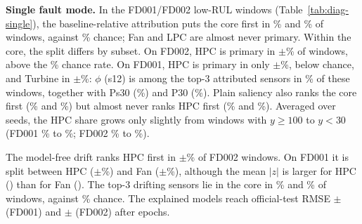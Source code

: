 \textbf{Single fault mode.} In the FD001/FD002 low-RUL windows (Table~\ref{tab:diag-single}), the baseline-relative attribution puts the core first in \DiagFdOneAttrCore{}\% and \DiagFdTwoAttrCore{}\% of windows, against \DiagChanceCore{}\% chance; Fan and LPC are almost never primary. Within the core, the split differs by subset. On FD002, HPC is primary in \DiagFdTwoAttrHpc{}$\pm$\DiagFdTwoAttrHpcStd{}\% of windows, above the \DiagChanceHpc{}\% chance rate. On FD001, HPC is primary in only \DiagFdOneAttrHpc{}$\pm$\DiagFdOneAttrHpcStd{}\%, below chance, and Turbine in \DiagFdOneAttrTurbine{}$\pm$\DiagFdOneAttrTurbineStd{}\%: $\phi$ (s12) is among the top-3 attributed sensors in \DiagFdOneTopPhi{}\% of these windows, together with Ps30 (\DiagFdOneTopPsThirty{}\%) and P30 (\DiagFdOneTopPThirty{}\%). Plain saliency also ranks the core first (\DiagFdOneGradCore{}\% and \DiagFdTwoGradCore{}\%) but almost never ranks HPC first (\DiagFdOneGradHpc{}\% and \DiagFdTwoGradHpc{}\%). Averaged over seeds, the HPC share grows only slightly from windows with $y\ge100$ to $y<30$ (FD001 \DiagFdOneShareHpcEarly{}\% to \DiagFdOneShareHpcLate{}\%; FD002 \DiagFdTwoShareHpcEarly{}\% to \DiagFdTwoShareHpcLate{}\%).

The model-free drift ranks HPC first in \DiagFdTwoDriftHpc{}$\pm$\DiagFdTwoDriftHpcStd{}\% of FD002 windows. On FD001 it is split between HPC (\DiagFdOneDriftHpc{}$\pm$\DiagFdOneDriftHpcStd{}\%) and Fan (\DiagFdOneDriftFan{}$\pm$\DiagFdOneDriftFanStd{}\%), although the mean $|z|$ is larger for HPC (\DiagFdOneAbsZHpc{}) than for Fan (\DiagFdOneAbsZFan{}). The top-3 drifting sensors lie in the core in \DiagFdOneDriftTopCore{}\% and \DiagFdTwoDriftTopCore{}\% of windows, against \DiagChanceCore{}\% chance. The explained models reach official-test RMSE \DiagFdOneRmse{}$\pm$\DiagFdOneRmseStd{} (FD001) and \DiagFdTwoRmse{}$\pm$\DiagFdTwoRmseStd{} (FD002) after \DiagEpochs{} epochs.

\begin{table}[t]
\centering
\caption{Unsupervised $k{=}2$ separation of FD003/FD004 engines by end-of-life profile (mean $\pm$ sample std over \DiagNumSeeds{} seeds; cross-seed ARI over the ten seed pairs). Cluster names come from cosine similarity to the label-free HPC reference, not from labels.}
\label{tab:diag-clusters}
\footnotesize
\setlength{\tabcolsep}{4pt}

\end{table}

